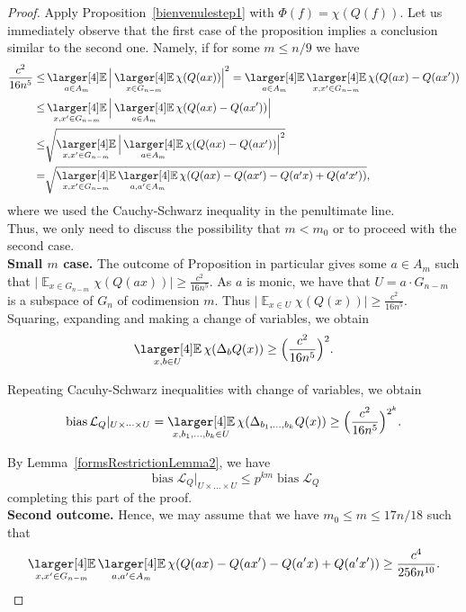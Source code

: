 \documentclass[a4paper,11pt]{article}
\theoremstyle{definition}
\newcommand{\on}[1]{
	\operatorname{#1}
}
\newcommand\ex{\mathop{\mathbb{E}}}
\newcommand{\exx}{
  \mathop{
    \mathchoice{\vcenter{\hbox{\larger[4]$\mathbb{E}$}}}
               {\kern0pt\mathbb{E}}
               {\kern0pt\mathbb{E}}
               {\kern0pt\mathbb{E}}
  }\displaylimits
}
\begin{document}
\begin{proof}
    Apply Proposition~\ref{bienvenulestep1} with $\Phi(f) = \chi(Q(f))$. Let us immediately observe that the first case of the proposition implies a conclusion similar to the second one. Namely, if for some $m \leq n/9$ we have
    \begin{align*}\frac{c^2}{16n^5}\leq &\exx_{a \in A_m} \Big|\exx_{x \in G_{n- m }} \chi(Q(ax))\Big|^2 = \exx_{a \in A_m} \exx_{x, x' \in G_{n- m }} \chi(Q(ax) - Q(ax'))\\
    \leq & \exx_{x, x' \in G_{n- m }} \Big|\exx_{a \in A_m}  \chi(Q(ax) - Q(ax'))\Big|\\
    \leq & \sqrt{\exx_{x, x' \in G_{n- m }} \Big|\exx_{a \in A_m}  \chi(Q(ax) - Q(ax'))\Big|^2}\\
    =&\sqrt{\exx_{x, x' \in G_{n- m }}\exx_{a,a' \in A_m}  \chi(Q(ax) - Q(ax') - Q(a'x) + Q(a'x'))}, \end{align*}
    where we used the Cauchy-Schwarz inequality in the penultimate line.\\

    Thus, we only need to discuss the possibility that $m  < m_0$ or to proceed with the second case.\\

    \noindent\textbf{Small $m$ case.} The outcome of Proposition in particular gives some $a \in A_m$ such that $\Big|\ex_{x \in G_{n- m}} \chi(Q(ax))\Big| \geq  \frac{c^2}{16n^5}$. As $a$ is monic, we have that $U = a \cdot G_{n-m}$ is a subspace of $G_n$ of codimension $m$. Thus $\Big|\ex_{x \in U} \chi(Q(x))\Big| \geq  \frac{c^2}{16n^5}$. Squaring, expanding and making a change of variables, we obtain 
    \[\exx_{x,b \in U} \chi(\Delta_b Q(x)) \geq \Big(\frac{c^2}{16n^5}\Big)^2.\]

    Repeating Cacuhy-Schwarz inequalities with change of variables, we obtain
    \[\on{bias} \mathcal{L}_Q|_{U \times \dots \times U} = \exx_{x, b_1, \dots, b_k \in U}  \chi(\Delta_{b_1, \dots, b_k} Q(x)) \geq \Big(\frac{c^2}{16n^5}\Big)^{2^k}.\]

    By Lemma~\ref{formsRestrictionLemma2}, we have 
    \[\on{bias} \mathcal{L}_Q|_{U \times \dots \times U} \leq p^{km} \on{bias} \mathcal{L}_Q\]
    completing this part of the proof.\\

    \noindent\textbf{Second outcome.} Hence, we may assume that we have $m_0 \leq m \leq 17n/18$ such that  
    \[\exx_{x, x' \in G_{n- m }}\exx_{a,a' \in A_m}  \chi(Q(ax) - Q(ax') - Q(a'x) + Q(a'x')) \geq \frac{c^4}{256n^{10}}.\]


\end{proof}
\end{document}

